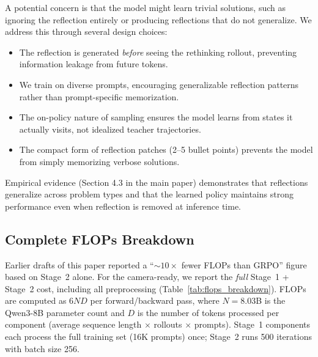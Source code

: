 \documentclass{article}
\theoremstyle{plain}
\theoremstyle{definition}
\theoremstyle{remark}
\begin{document}
A potential concern is that the model might learn trivial solutions, such as ignoring the reflection entirely or producing reflections that do not generalize.
We address this through several design choices:
\begin{itemize}
\item[(i)] The reflection is generated \emph{before} seeing the rethinking rollout, preventing information leakage from future tokens.
\item[(ii)] We train on diverse prompts, encouraging generalizable reflection patterns rather than prompt-specific memorization.
\item[(iii)] The on-policy nature of sampling ensures the model learns from states it actually visits, not idealized teacher trajectories.
\item[(iv)] The compact form of reflection patches (2--5 bullet points) prevents the model from simply memorizing verbose solutions.
\end{itemize}

Empirical evidence (Section 4.3 in the main paper) demonstrates that reflections generalize across problem types and that the learned policy maintains strong performance even when reflection is removed at inference time.

\subsection{Complete FLOPs Breakdown}
\label{appendix:flops}

Earlier drafts of this paper reported a ``$\sim$$10\times$ fewer FLOPs than GRPO'' figure based on Stage~2 alone.
For the camera-ready, we report the \emph{full} Stage~1 + Stage~2 cost, including all preprocessing (Table~\ref{tab:flops_breakdown}).
FLOPs are computed as $6ND$ per forward/backward pass, where $N=8.03$B is the Qwen3-8B parameter count and $D$ is the number of tokens processed per component (average sequence length $\times$ rollouts $\times$ prompts).
Stage~1 components each process the full training set (16K prompts) once; Stage~2 runs 500 iterations with batch size 256.
\end{document}

